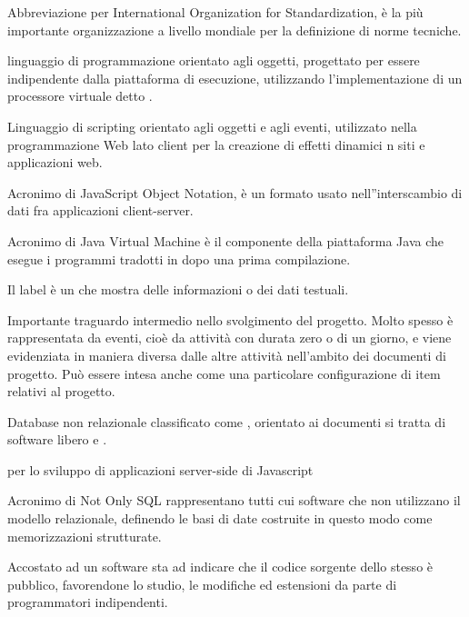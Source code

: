 Abbreviazione per International Organization for Standardization, è la più importante organizzazione a livello mondiale per la definizione di norme tecniche.
\clearpage

linguaggio di programmazione orientato agli oggetti, progettato per essere indipendente dalla piattaforma di esecuzione, utilizzando l'implementazione di un processore virtuale detto .

Linguaggio di scripting orientato agli oggetti e agli eventi, utilizzato nella programmazione Web lato client per la creazione di effetti dinamici n siti e applicazioni web.

Acronimo di JavaScript Object Notation, \`e un formato usato nell''interscambio di dati fra applicazioni client-server.

Acronimo di Java Virtual Machine \`e il componente della piattaforma Java che esegue i programmi tradotti in  dopo una prima compilazione.
\clearpage

Il label è un  che mostra delle informazioni o dei dati testuali.
\clearpage

Importante traguardo intermedio nello svolgimento del progetto. Molto spesso è rappresentata da eventi, cioè da attività con durata zero o di un giorno, e viene evidenziata in maniera diversa dalle altre attività nell'ambito dei documenti di progetto. Può essere intesa anche come una particolare configurazione di item relativi al progetto.

Database non relazionale classificato come , orientato ai documenti si tratta di software libero e .
\clearpage

 per lo sviluppo di applicazioni server-side di Javascript

Acronimo di Not Only SQL rappresentano tutti cui software che non utilizzano il modello relazionale, definendo le basi di date costruite in questo modo come memorizzazioni strutturate.
\clearpage

Accostato ad un software sta ad indicare che il codice sorgente dello stesso \`e pubblico, favorendone lo studio, le modifiche ed estensioni da parte di programmatori indipendenti.
\clearpage

